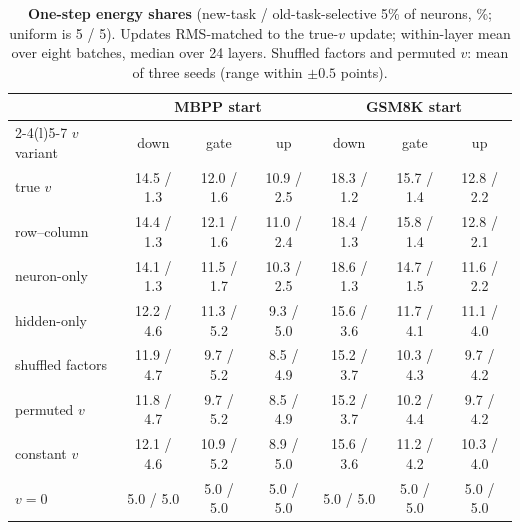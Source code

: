 \begin{table}[tbp]
\centering\footnotesize
\caption{\textbf{One-step energy shares} (new-task / old-task-selective 5\% of neurons, \%; uniform is 5 / 5). Updates
RMS-matched to the true-$v$ update; within-layer mean over eight batches, median over 24 layers. Shuffled factors and
permuted $v$: mean of three seeds (range within $\pm0.5$ points).}
\label{tab:onestep}
\setlength{\tabcolsep}{4pt}
\begin{tabular}{@{}lcccccc@{}}
\toprule
& \multicolumn{3}{c}{MBPP start} & \multicolumn{3}{c}{GSM8K start} \\
\cmidrule(lr){2-4}\cmidrule(l){5-7}
$v$ variant & down & gate & up & down & gate & up \\
\midrule
true $v$ & 14.5 / 1.3 & 12.0 / 1.6 & 10.9 / 2.5 & 18.3 / 1.2 & 15.7 / 1.4 & 12.8 / 2.2 \\
row--column & 14.4 / 1.3 & 12.1 / 1.6 & 11.0 / 2.4 & 18.4 / 1.3 & 15.8 / 1.4 & 12.8 / 2.1 \\
neuron-only & 14.1 / 1.3 & 11.5 / 1.7 & 10.3 / 2.5 & 18.6 / 1.3 & 14.7 / 1.5 & 11.6 / 2.2 \\
hidden-only & 12.2 / 4.6 & 11.3 / 5.2 & \phantom{0}9.3 / 5.0 & 15.6 / 3.6 & 11.7 / 4.1 & 11.1 / 4.0 \\
shuffled factors & 11.9 / 4.7 & \phantom{0}9.7 / 5.2 & \phantom{0}8.5 / 4.9 & 15.2 / 3.7 & 10.3 / 4.3 & \phantom{0}9.7 / 4.2 \\
permuted $v$ & 11.8 / 4.7 & \phantom{0}9.7 / 5.2 & \phantom{0}8.5 / 4.9 & 15.2 / 3.7 & 10.2 / 4.4 & \phantom{0}9.7 / 4.2 \\
constant $v$ & 12.1 / 4.6 & 10.9 / 5.2 & \phantom{0}8.9 / 5.0 & 15.6 / 3.6 & 11.2 / 4.2 & 10.3 / 4.0 \\
$v=0$ & \phantom{0}5.0 / 5.0 & \phantom{0}5.0 / 5.0 & \phantom{0}5.0 / 5.0 & \phantom{0}5.0 / 5.0 & \phantom{0}5.0 / 5.0 & \phantom{0}5.0 / 5.0 \\
\bottomrule
\end{tabular}
\end{table}
